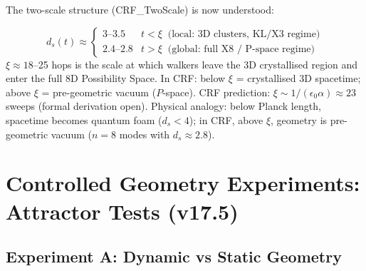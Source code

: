 \documentclass[12pt, a4paper]{article}
\begin{document}
The two-scale structure (CRF\_TwoScale) is now understood:

\begin{derivedbox}[title={$\xi$ = Spacetime / P-Space Crossover (Derived)}]
\[
  d_s(t) \approx \begin{cases}
    3\text{--}3.5 & t < \xi \;\;\text{(local: 3D clusters, KL/X3 regime)}\\
    2.4\text{--}2.8 & t > \xi \;\;\text{(global: full X8 / P-space regime)}
  \end{cases}
\]
$\xi\approx 18$--25 hops is the scale at which walkers leave the 3D crystallised region and enter the full 8D Possibility Space.
In CRF: below $\xi$ = crystallised 3D spacetime; above $\xi$ = pre-geometric vacuum ($P$-space).
CRF prediction: $\xi\sim 1/(\epsilon_0\alpha)\approx 23$ sweeps (formal derivation open).
Physical analogy: below Planck length, spacetime becomes quantum foam ($d_s<4$); in CRF, above $\xi$, geometry is pre-geometric vacuum ($n=8$ modes with $d_s\approx 2.8$).
\end{derivedbox}


\section{Controlled Geometry Experiments: Attractor Tests (v17.5)}

\subsection{Experiment A: Dynamic vs Static Geometry}
\end{document}
